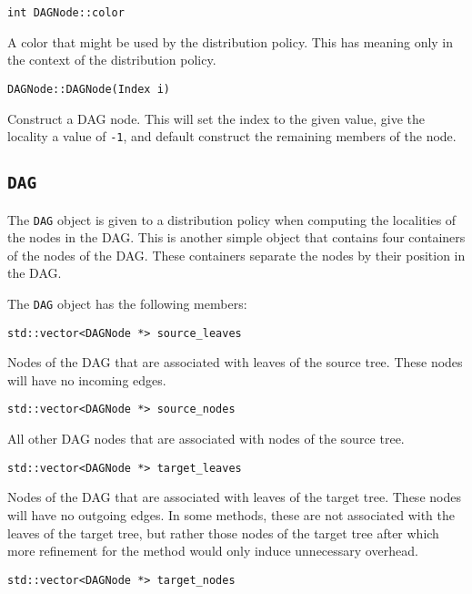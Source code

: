 \begin{lstlisting}
int DAGNode::color
\end{lstlisting}

\noindent A color that might be used by the distribution policy. This has
meaning only in the context of the distribution policy.

\begin{lstlisting}
DAGNode::DAGNode(Index i)
\end{lstlisting}

\noindent Construct a DAG node. This will set the index to the given value,
give the locality a value of \texttt{-1}, and default construct the remaining
members of the node.


\subsection{\texttt{DAG}}

The \texttt{DAG} object is given to a distribution policy when computing the
localities of the nodes in the DAG. This is another simple object that contains
four containers of the nodes of the DAG. These containers separate the nodes
by their position in the DAG.

The \texttt{DAG} object has the following members:

\begin{lstlisting}
std::vector<DAGNode *> source_leaves
\end{lstlisting}

\noindent Nodes of the DAG that are associated with leaves of the source tree.
These nodes will have no incoming edges.

\begin{lstlisting}
std::vector<DAGNode *> source_nodes
\end{lstlisting}

\noindent All other DAG nodes that are associated with nodes of the source tree.

\begin{lstlisting}
std::vector<DAGNode *> target_leaves
\end{lstlisting}

\noindent Nodes of the DAG that are associated with leaves of the target tree.
These nodes will have no outgoing edges. In some methods, these are not
associated with the leaves of the target tree, but rather those nodes of the
target tree after which more refinement for the method would only induce
unnecessary overhead.

\begin{lstlisting}
std::vector<DAGNode *> target_nodes
\end{lstlisting}

